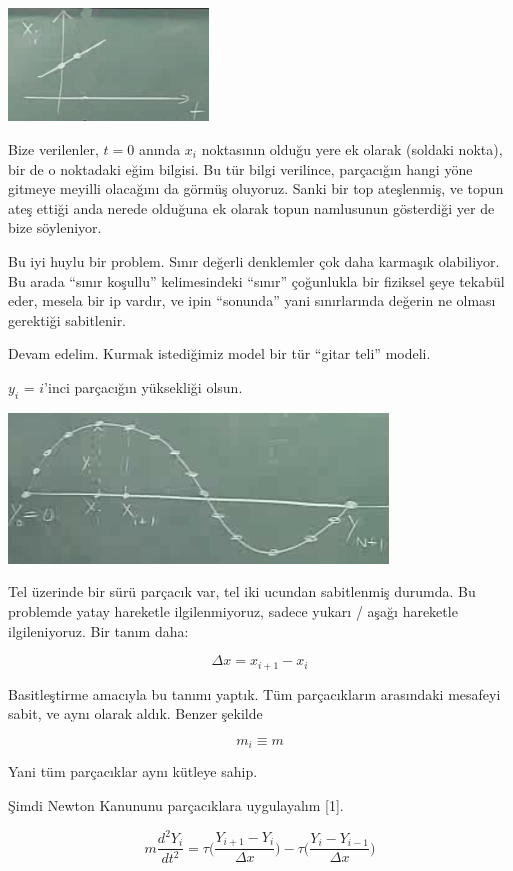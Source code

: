 \documentclass[12pt,fleqn]{article}\usepackage{../../common}
\begin{document}
\includegraphics[height=3cm]{1_06.png}

Bize verilenler, $t=0$ anında $x_i$ noktasının olduğu yere ek olarak
(soldaki nokta), bir de o noktadaki eğim bilgisi. Bu tür bilgi verilince,
parçacığın hangi yöne gitmeye meyilli olacağını da görmüş oluyoruz. Sanki
bir top ateşlenmiş, ve topun ateş ettiği anda nerede olduğuna ek olarak
topun namlusunun gösterdiği yer de bize söyleniyor.

Bu iyi huylu bir problem. Sınır değerli denklemler çok daha karmaşık
olabiliyor. Bu arada ``sınır koşullu'' kelimesindeki ``sınır'' çoğunlukla
bir fiziksel şeye tekabül eder, mesela bir ip vardır, ve ipin ``sonunda''
yani sınırlarında değerin ne olması gerektiği sabitlenir. 

Devam edelim. Kurmak istediğimiz model bir tür ``gitar teli'' modeli. 

$y_i$ = $i$'inci parçacığın yüksekliği olsun. 

\includegraphics[height=4cm]{1_07.png}

Tel üzerinde bir sürü parçacık var, tel iki ucundan sabitlenmiş durumda. Bu
problemde yatay hareketle ilgilenmiyoruz, sadece yukarı / aşağı hareketle
ilgileniyoruz. Bir tanım daha:

$$ \Delta x = x_{i+1} - x_i  $$

Basitleştirme amacıyla bu tanımı yaptık. Tüm parçacıkların arasındaki
mesafeyi sabit, ve aynı olarak aldık. Benzer şekilde

$$ m_i \equiv m $$

Yani tüm parçacıklar aynı kütleye sahip. 

Şimdi Newton Kanununu parçacıklara uygulayalım [1]. 

$$ m \frac{d^2Y_i}{dt^2} = 
\tau \bigg( \frac{Y_{i+1}- Y_i}{\Delta x} \bigg) -
\tau \bigg( \frac{Y_{i}- Y_{i-1}}{\Delta x} \bigg) 
$$
\end{document}
